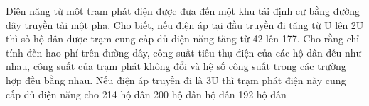 \begin{vidu}%
	Điện năng từ một trạm phát điện được đưa đến một khu tái định cư bằng đường dây truyền tải một pha. Cho biết, nếu điện áp tại đầu truyền đi tăng từ U lên 2U thì số hộ dân được trạm cung cấp đủ điện năng tăng từ 42 lên 177. Cho rằng chỉ tính đến hao phí trên đường dây, công suất tiêu thụ điện của các hộ dân đều như nhau, công suất của trạm phát không đổi và hệ số công suất trong các trường hợp đều bằng nhau. Nếu điện áp truyền đi là 3U thì trạm phát điện này cung cấp đủ điện năng cho
	\choice
	{214 hộ dân}
	{200 hộ dân}
	{ hộ dân}
	{192 hộ dân}
\end{vidu}
